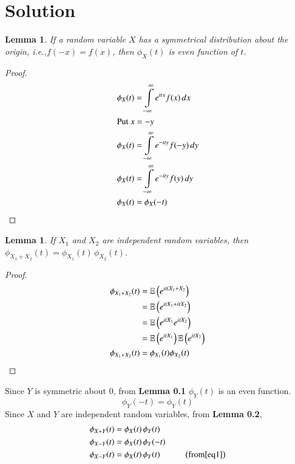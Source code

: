 \documentclass[journal,12pt,twocolumn]{IEEEtran}
\newtheorem{lemma}[theorem]{Lemma}
\begin{document}
\section*{Solution}
\begin{lemma}
If a random variable $X$ has a symmetrical distribution about the origin, i.e.,$f(-x) = f(x)$,
then $\phi_X(t)$ is even function of $t$.
\end{lemma}
\begin{proof}
\begin{align}
    \phi_X(t) &= \int \limits_{-\infty}^{\infty} e^{itx}f(x) \, dx \\
    \intertext{Put $x = -y$}
    \phi_X(t) &= \int \limits_{-\infty}^{\infty} e^{-ity}f(-y) \, dy \\
    \phi_X(t) &= \int \limits_{-\infty}^{\infty} e^{-ity}f(y) \, dy \\
    \phi_X(t) &= \phi_X(-t)
\end{align}
\end{proof}
\begin{lemma}
If $X_1$ and $X_2$ are independent random variables, then $\phi_{X_1 + X_2}(t) = \phi_{X_1}(t)\, \phi_{X_2}(t)$.
\end{lemma}
\begin{proof}
\begin{align}
    \phi_{X_1 + X_2}(t) &= \mathbb{E}\left(e^{it(X_1+X_2}\right)\\
    &= \mathbb{E}\left(e^{itX_1+itX_2}\right)\\
    &= \mathbb{E}\left(e^{itX_1}e^{itX_2}\right)\\
    &= \mathbb{E}\left(e^{itX_1}\right)\mathbb{E}\left(e^{itX_2}\right)\\
    \phi_{X_1 + X_2}(t) &= \phi_{X_1}(t)\phi_{X_2}(t)
\end{align}
\end{proof}
Since $Y$ is symmetric about $0$, from \textbf{Lemma 0.1} $\phi_Y(t)$ is an even function.
\begin{equation}
    \phi_Y(-t) = \phi_Y(t) \label{eq1}
\end{equation}
Since $X$ and $Y$ are independent random variables, from \textbf{Lemma 0.2},
\begin{align}
    \phi_{X+Y}(t) &= \phi_X(t)\, \phi_Y(t) \label{eq2}\\
    \phi_{X-Y}(t) &= \phi_X(t)\, \phi_Y(-t) \label{eq3}\\
    \phi_{X-Y}(t) &= \phi_X(t)\, \phi_Y(t) \hspace{1cm}\left(\text{from} \eqref{eq1}\right) \label{eq4}
\end{align}
\end{document}
